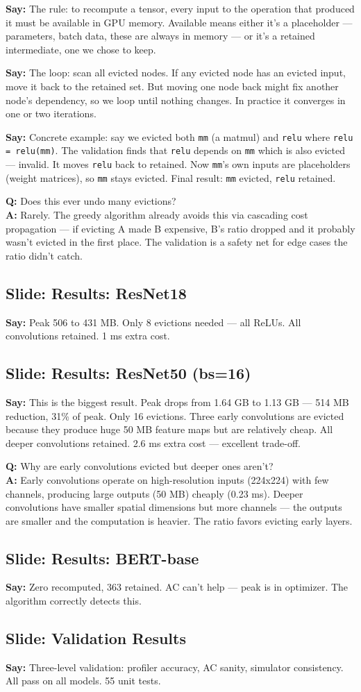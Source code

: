\documentclass[11pt]{article}
\newcommand{\slide}[1]{\subsection*{Slide: #1}}
\newcommand{\say}[1]{\textbf{Say:} #1}
\newcommand{\qa}[2]{\textcolor{question}{\textbf{Q:} #1} \\ \textbf{A:} #2}
\begin{document}
\say{The rule: to recompute a tensor, every input to the operation that produced it must be available in GPU memory. Available means either it's a placeholder --- parameters, batch data, these are always in memory --- or it's a retained intermediate, one we chose to keep.}

\say{The loop: scan all evicted nodes. If any evicted node has an evicted input, move it back to the retained set. But moving one node back might fix another node's dependency, so we loop until nothing changes. In practice it converges in one or two iterations.}

\say{Concrete example: say we evicted both \texttt{mm} (a matmul) and \texttt{relu} where \texttt{relu = relu(mm)}. The validation finds that \texttt{relu} depends on \texttt{mm} which is also evicted --- invalid. It moves \texttt{relu} back to retained. Now \texttt{mm}'s own inputs are placeholders (weight matrices), so \texttt{mm} stays evicted. Final result: \texttt{mm} evicted, \texttt{relu} retained.}

\qa{Does this ever undo many evictions?}{Rarely. The greedy algorithm already avoids this via cascading cost propagation --- if evicting A made B expensive, B's ratio dropped and it probably wasn't evicted in the first place. The validation is a safety net for edge cases the ratio didn't catch.}

\slide{Results: ResNet18}
\say{Peak 506 to 431 MB. Only 8 evictions needed --- all ReLUs. All convolutions retained. 1 ms extra cost.}

\slide{Results: ResNet50 (bs=16)}
\say{This is the biggest result. Peak drops from 1.64 GB to 1.13 GB --- 514 MB reduction, 31\% of peak. Only 16 evictions. Three early convolutions are evicted because they produce huge 50 MB feature maps but are relatively cheap. All deeper convolutions retained. 2.6 ms extra cost --- excellent trade-off.}

\qa{Why are early convolutions evicted but deeper ones aren't?}{Early convolutions operate on high-resolution inputs (224x224) with few channels, producing large outputs (50 MB) cheaply (0.23 ms). Deeper convolutions have smaller spatial dimensions but more channels --- the outputs are smaller and the computation is heavier. The ratio favors evicting early layers.}

\slide{Results: BERT-base}
\say{Zero recomputed, 363 retained. AC can't help --- peak is in optimizer. The algorithm correctly detects this.}

\slide{Validation Results}
\say{Three-level validation: profiler accuracy, AC sanity, simulator consistency. All pass on all models. 55 unit tests.}
\end{document}
